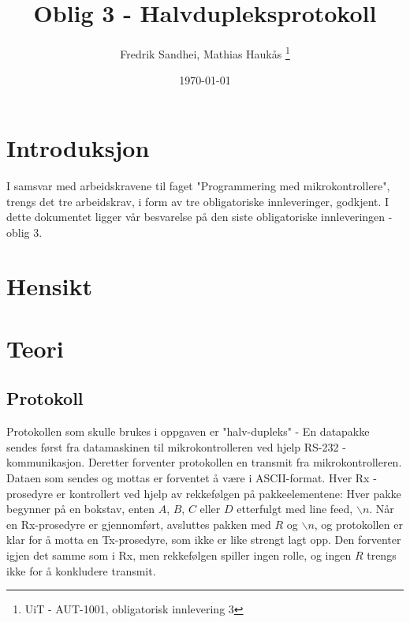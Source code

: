 \documentclass[11pt, a4paper]{report}
\begin{document}
\title{Oblig 3 - Halvdupleksprotokoll}
\author{Fredrik Sandhei, Mathias Haukås \thanks{UiT - AUT-1001, obligatorisk innlevering 3}}
\date{\today}
\maketitle
\newpage
\tableofcontents
\newpage

\section{Introduksjon}
I samsvar med arbeidskravene til faget "Programmering med mikrokontrollere", trengs det tre arbeidskrav, i form av tre obligatoriske innleveringer, godkjent. I dette dokumentet ligger vår besvarelse på den siste obligatoriske innleveringen - oblig 3. 

\section{Hensikt}

\section{Teori}

\subsection{Protokoll}
Protokollen som skulle brukes i oppgaven er "halv-dupleks" - En datapakke sendes først fra datamaskinen til mikrokontrolleren ved hjelp RS-232 - kommunikasjon. Deretter forventer protokollen en transmit fra mikrokontrolleren. Dataen som sendes og mottas er forventet å være i ASCII-format. Hver Rx - prosedyre er kontrollert ved hjelp av rekkefølgen på pakkeelementene: Hver pakke begynner på en bokstav, enten $A$, $B$, $C$ eller $D$ etterfulgt med line feed, $\backslash n$. Når en Rx-prosedyre er gjennomført, avsluttes pakken med $R$ og $\backslash n$, og protokollen er klar for å motta en Tx-prosedyre, som ikke er like strengt lagt opp. Den forventer igjen det samme som i Rx, men rekkefølgen spiller ingen rolle, og ingen $R$ trengs ikke for å konkludere transmit. 
\end{document}
